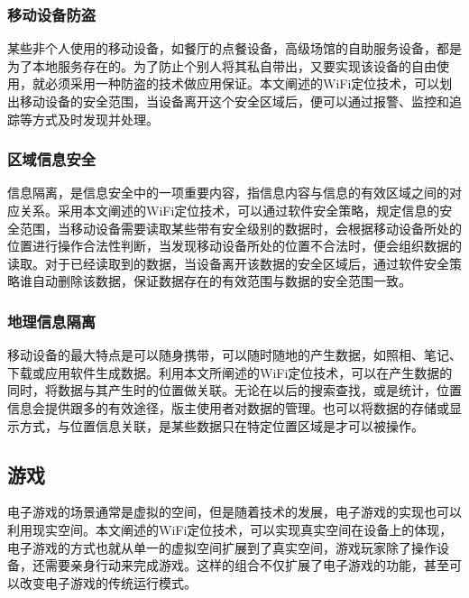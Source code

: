 \documentclass[UTF8, twocolumn ]{ctexart}
\begin{document}
\subsubsection{移动设备防盗}
某些非个人使用的移动设备，如餐厅的点餐设备，高级场馆的自助服务设备，都是为了本地服务存在的。为了防止个别人将其私自带出，又要实现该设备的自由使用，就必须采用一种防盗的技术做应用保证。本文阐述的WiFi定位技术，可以划出移动设备的安全范围，当设备离开这个安全区域后，便可以通过报警、监控和追踪等方式及时发现并处理。
\subsubsection{区域信息安全}
信息隔离，是信息安全中的一项重要内容，指信息内容与信息的有效区域之间的对应关系。采用本文阐述的WiFi定位技术，可以通过软件安全策略，规定信息的安全范围，当移动设备需要读取某些带有安全级别的数据时，会根据移动设备所处的位置进行操作合法性判断，当发现移动设备所处的位置不合法时，便会组织数据的读取。对于已经读取到的数据，当设备离开该数据的安全区域后，通过软件安全策略谁自动删除该数据，保证数据存在的有效范围与数据的安全范围一致。
\subsubsection{地理信息隔离}
移动设备的最大特点是可以随身携带，可以随时随地的产生数据，如照相、笔记、下载或应用软件生成数据。利用本文所阐述的WiFi定位技术，可以在产生数据的同时，将数据与其产生时的位置做关联。无论在以后的搜索查找，或是统计，位置信息会提供跟多的有效途径，版主使用者对数据的管理。也可以将数据的存储或显示方式，与位置信息关联，是某些数据只在特定位置区域是才可以被操作。
\subsection{游戏}
电子游戏的场景通常是虚拟的空间，但是随着技术的发展，电子游戏的实现也可以利用现实空间。本文阐述的WiFi定位技术，可以实现真实空间在设备上的体现，电子游戏的方式也就从单一的虚拟空间扩展到了真实空间，游戏玩家除了操作设备，还需要亲身行动来完成游戏。这样的组合不仅扩展了电子游戏的功能，甚至可以改变电子游戏的传统运行模式。
\end{document}
